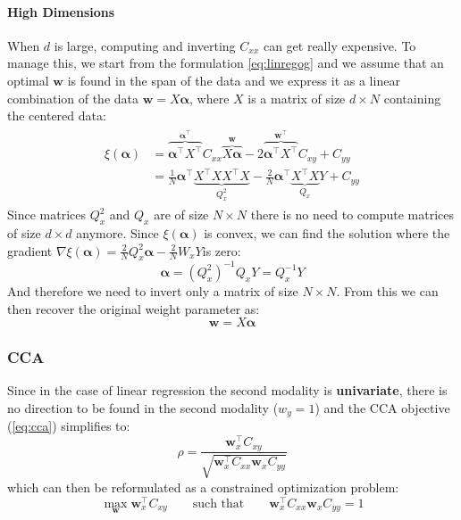 \paragraph{High Dimensions} When $d$ is large, computing and inverting $C_{xx}$ can get really expensive. To manage this, we start from the formulation \ref{eq:linregog} and we assume that an optimal $\mathbf{w}$ is found in the span of the data and we express it as a linear combination of the data $\mathbf{w} = X \mathbf{\alpha}$, where $X$ is a matrix of size $d \times N$ containing the centered data:
\begin{align}
	\begin{split}
		\xi(\mathbf{\alpha}) & = \overbrace{\mathbf{\alpha}^\top X^\top}^{\mathbf{\alpha}^\top}C_{xx}\overbrace{X\mathbf{\alpha}}^{\mathbf{w}} - 2 \overbrace{\mathbf{\alpha}^\top X^\top}^{\mathbf{w}^\top}C_{xy}+C_{yy} \\
		& = \frac{1}{N}\mathbf{\alpha}^\top \underbrace{X^\top XX^\top X}_{Q_x^2}-\frac{2}{N}\mathbf{\alpha}^\top \underbrace{X^\top X}_{Q_x}Y+C_{yy}
	\end{split}
\end{align} 
Since matrices $Q_x^2$ and $Q_x$ are of size $N \times N$ there is no need to compute matrices of size $d \times d$ anymore. Since $\xi(\mathbf{\alpha})$ is convex, we can find the solution where the gradient $\nabla\xi(\mathbf{\alpha}) = \frac{2}{N}Q_x^2\mathbf{\alpha}-\frac{2}{N}W_x Y$is zero:
\begin{equation*}
	\mathbf{\alpha} = (Q_x^2)^{-1}Q_xY = Q_x^{-1}Y
\end{equation*}
And therefore we need to invert only a matrix of size $N \times N$. From this we can then recover the original weight parameter as:
\begin{equation}
	\mathbf{w} = X \mathbf{\alpha}
\end{equation}

\subsubsection{CCA}
Since in the case of linear regression the second modality is \textbf{univariate}, there is no direction to be found in the second modality ($w_y = 1$) and the CCA objective (\ref{eq:cca}) simplifies to:
\begin{equation}
	\rho = \frac{\mathbf{w}_x^\top C_{xy}}{\sqrt{\mathbf{w}^\top_x C_{xx}\mathbf{w}_xC_{yy}}} 
\end{equation}
which can then be reformulated as a constrained optimization problem:
\begin{equation}
	\max_\mathbf{w} \mathbf{w}_x^\top C_{xy} \qquad\text{such that}\qquad \mathbf{w}_x^\top C_{xx}\mathbf{w}_xC_{yy} = 1 \label{eq:ccalsr}
\end{equation}

